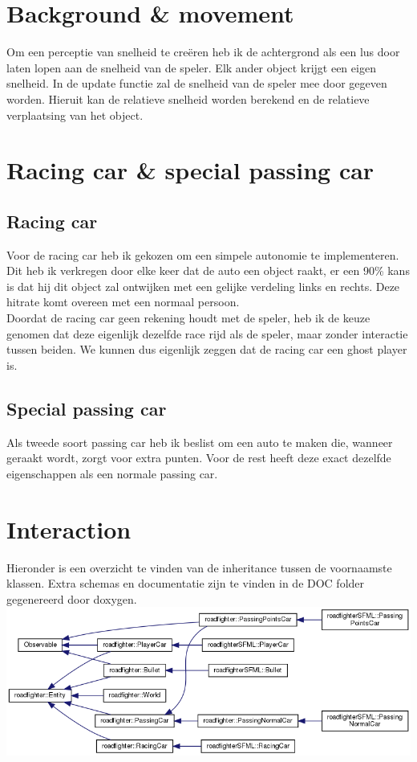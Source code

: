 \documentclass[12pt,a4paper]{article}
\begin{document}
\section{Background \& movement}
Om een perceptie van snelheid te cre\"eren heb ik de achtergrond als een lus door laten lopen aan de snelheid van de speler. Elk ander object krijgt een eigen snelheid. In de update functie zal de snelheid van de speler mee door gegeven worden. Hieruit kan de relatieve snelheid worden berekend en de relatieve verplaatsing van het object.

\section{Racing car \& special passing car}
\subsection{Racing car}
Voor de racing car heb ik gekozen om een simpele autonomie te implementeren. Dit heb ik verkregen door elke keer dat de auto een object raakt, er een 90\% kans is dat hij dit object zal ontwijken met een gelijke verdeling links en rechts. Deze hitrate komt overeen met een normaal persoon.\\
Doordat de racing car geen rekening houdt met de speler, heb ik de keuze genomen dat deze eigenlijk dezelfde race rijd als de speler, maar zonder interactie tussen beiden. We kunnen dus eigenlijk zeggen dat de racing car een ghost player is. 

\subsection{Special passing car}
Als tweede soort passing car heb ik beslist om een auto te maken die, wanneer geraakt wordt, zorgt voor extra punten. Voor de rest heeft deze exact dezelfde eigenschappen als een normale passing car.

\section{Interaction}
Hieronder is een overzicht te vinden van de inheritance tussen de voornaamste klassen. Extra schemas en documentatie zijn te vinden in de DOC folder gegenereerd door doxygen.\\
\includegraphics[scale=0.5]{img/inherit_graph_2.png}
\end{document}

